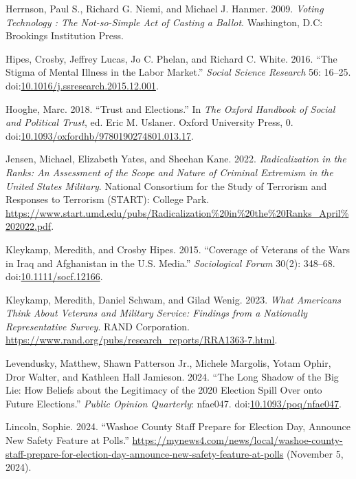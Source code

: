\documentclass[
  12pt,
  letterpaper,
]{article}
\newlength{\cslhangindent}
\newenvironment{CSLReferences}[2] %
 {\begin{list}{}{%
  \setlength{\itemindent}{0pt}
  \setlength{\leftmargin}{0pt}
  \setlength{\parsep}{0pt}
  \ifodd #1
   \setlength{\leftmargin}{\cslhangindent}
   \setlength{\itemindent}{-1\cslhangindent}
  \fi
  \setlength{\itemsep}{#2\baselineskip}}}
 {\end{list}}
\begin{document}
\begin{CSLReferences}{1}{1}
Herrnson, Paul S., Richard G. Niemi, and Michael J. Hanmer. 2009.
\emph{Voting Technology : The Not-so-Simple Act of Casting a Ballot}.
Washington, D.C: Brookings Institution Press.

Hipes, Crosby, Jeffrey Lucas, Jo C. Phelan, and Richard C. White. 2016.
{``The Stigma of Mental Illness in the Labor Market.''} \emph{Social
Science Research} 56: 16--25.
doi:\href{https://doi.org/10.1016/j.ssresearch.2015.12.001}{10.1016/j.ssresearch.2015.12.001}.

Hooghe, Marc. 2018. {``Trust and {Elections}.''} In \emph{The {Oxford
Handbook} of {Social} and {Political Trust}}, ed. Eric M. Uslaner.
Oxford University Press, 0.
doi:\href{https://doi.org/10.1093/oxfordhb/9780190274801.013.17}{10.1093/oxfordhb/9780190274801.013.17}.

Jensen, Michael, Elizabeth Yates, and Sheehan Kane. 2022.
\emph{Radicalization in the {Ranks}: {An Assessment} of the {Scope} and
{Nature} of {Criminal Extremism} in the {United States Military}}.
{National Consortium for the Study of Terrorism and Responses to
Terrorism (START): College Park}.
\url{https://www.start.umd.edu/pubs/Radicalization\%20in\%20the\%20Ranks_April\%202022.pdf}.

Kleykamp, Meredith, and Crosby Hipes. 2015. {``Coverage of {Veterans} of
the {Wars} in {Iraq} and {Afghanistan} in the {U}.{S}. {Media}.''}
\emph{Sociological Forum} 30(2): 348--68.
doi:\href{https://doi.org/10.1111/socf.12166}{10.1111/socf.12166}.

Kleykamp, Meredith, Daniel Schwam, and Gilad Wenig. 2023. \emph{What
{Americans Think About Veterans} and {Military Service}: {Findings} from
a {Nationally Representative Survey}}. RAND Corporation.
\url{https://www.rand.org/pubs/research_reports/RRA1363-7.html}.

Levendusky, Matthew, Shawn Patterson Jr., Michele Margolis, Yotam Ophir,
Dror Walter, and Kathleen Hall Jamieson. 2024. {``The {Long Shadow} of
the {Big Lie}: {How Beliefs} about the {Legitimacy} of the 2020
{Election Spill Over} onto {Future Elections}.''} \emph{Public Opinion
Quarterly}: nfae047.
doi:\href{https://doi.org/10.1093/poq/nfae047}{10.1093/poq/nfae047}.

Lincoln, Sophie. 2024. {``Washoe {County} Staff Prepare for {Election
Day}, Announce New Safety Feature at Polls.''}
\url{https://mynews4.com/news/local/washoe-county-staff-prepare-for-election-day-announce-new-safety-feature-at-polls}
(November 5, 2024).


\end{CSLReferences}
\end{document}

